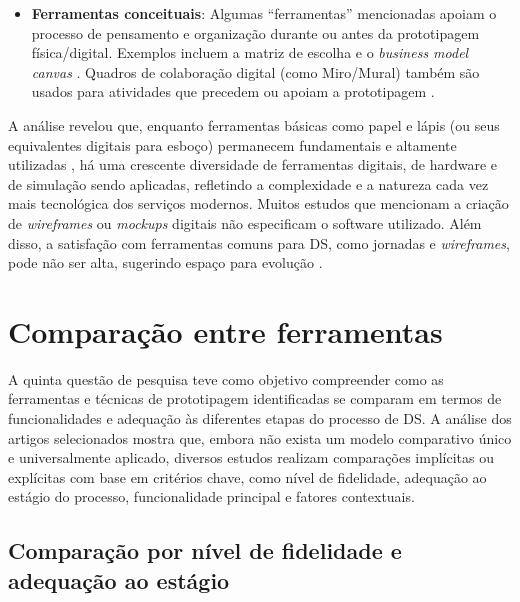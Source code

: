 \begin{itemize}
	\item \textbf{Ferramentas conceituais}: Algumas ``ferramentas'' mencionadas apoiam o processo de pensamento e organização durante ou antes da prototipagem física/digital. Exemplos incluem a matriz de escolha \cite{soto2023prototyping} e o \textit{business model canvas} \cite{you2022applying, paust2025integrative}. Quadros de colaboração digital (como Miro/Mural) também são usados para atividades que precedem ou apoiam a prototipagem \cite{quintero2021interdisciplinary, iriarte2023service}.
	
\end{itemize}

A análise revelou que, enquanto ferramentas básicas como papel e lápis (ou seus equivalentes digitais para esboço) permanecem fundamentais e altamente utilizadas \cite{wang2023smartproducts}, há uma crescente diversidade de ferramentas digitais, de hardware e de simulação sendo aplicadas, refletindo a complexidade e a natureza cada vez mais tecnológica dos serviços modernos. Muitos estudos que mencionam a criação de \textit{wireframes} ou \textit{mockups} digitais não especificam o software utilizado. Além disso, a satisfação com ferramentas comuns para DS, como jornadas e \textit{wireframes}, pode não ser alta, sugerindo espaço para evolução \cite{wang2023smartproducts}.



\section{Comparação entre ferramentas}

A quinta questão de pesquisa teve como objetivo compreender como as ferramentas e técnicas de prototipagem identificadas se comparam em termos de funcionalidades e adequação às diferentes etapas do processo de DS. A análise dos artigos selecionados mostra que, embora não exista um modelo comparativo único e universalmente aplicado, diversos estudos realizam comparações implícitas ou explícitas com base em critérios chave, como nível de fidelidade, adequação ao estágio do processo, funcionalidade principal e fatores contextuais.

\subsection{Comparação por nível de fidelidade e adequação ao estágio}

